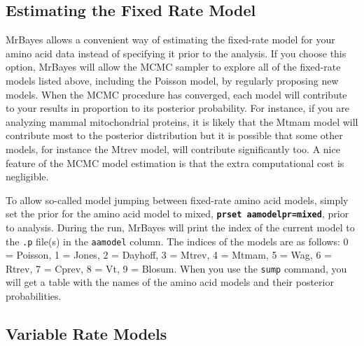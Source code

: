 \documentclass[12pt]{book}
\newcommand{\ttt}[1]{\texttt{#1}}
\newcommand{\tb}[1]{\ttt{\textbf{#1}}}
\begin{document}
\subsection{Estimating the Fixed Rate Model}
\label{estimatingTheFixedRateModel}

MrBayes allows a convenient way of estimating the fixed-rate model for your amino acid data instead
of specifying it prior to the analysis. If you choose this option, MrBayes will allow the MCMC
sampler to explore all of the fixed-rate models listed above, including the Poisson model, by
regularly proposing new models. When the MCMC procedure has converged, each model will contribute
to your results in proportion to its posterior probability. For instance, if you are analyzing
mammal mitochondrial proteins, it is likely that the Mtmam model will contribute most to the
posterior distribution but it is possible that some other models, for instance the Mtrev model,
will contribute significantly too. A nice feature of the MCMC model estimation is that the extra
computational cost is negligible.

To allow so-called model jumping between fixed-rate amino acid models, simply set the prior for the
amino acid model to mixed, \tb{prset aamodelpr=mixed}, prior to analysis. During the run, MrBayes
will print the index of the current model to the \ttt{.p} file(s) in the \ttt{aamodel} column. The
indices of the models are as follows: 0 = Poisson, 1 = Jones, 2 = Dayhoff, 3 = Mtrev, 4 = Mtmam, 5
= Wag, 6 = Rtrev, 7 = Cprev, 8 = Vt, 9 = Blosum. When you use the \ttt{sump} command, you will get
a table with the names of the amino acid models and their posterior probabilities.

\subsection{Variable Rate Models}
\end{document}
